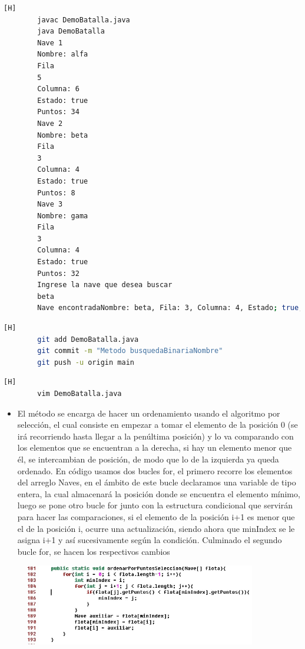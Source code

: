 \documentclass{article}
\begin{document}
	
	\begin{lstlisting}[language=bash,caption={Probando el metodo busquedaBinariaNombre}][H]	
		javac DemoBatalla.java
		java DemoBatalla
		Nave 1
		Nombre: alfa
		Fila
		5
		Columna: 6
		Estado: true
		Puntos: 34
		Nave 2
		Nombre: beta
		Fila
		3
		Columna: 4
		Estado: true
		Puntos: 8
		Nave 3
		Nombre: gama
		Fila
		3
		Columna: 4
		Estado: true
		Puntos: 32
		Ingrese la nave que desea buscar
		beta
		Nave encontradaNombre: beta, Fila: 3, Columna: 4, Estado; true, Puntos: 8
	\end{lstlisting}
	\begin{lstlisting}[language=bash,caption={Commit:"Metodo busquedaBinariaNombre" }][H]
		git add DemoBatalla.java
		git commit -m "Metodo busquedaBinariaNombre"			
		git push -u origin main
	\end{lstlisting}
	
	
	
	
	

	
	\begin{lstlisting}[language=bash,caption={Implementado el método ordenarPorPuntosSeleccion }][H]
		vim DemoBatalla.java
	\end{lstlisting}
	
	
	\begin{itemize}	
		\item El método se encarga de hacer un ordenamiento usando el algoritmo por selección, el cual consiste en empezar a tomar el elemento de la posición 0 (se irá recorriendo hasta llegar a la penúltima posición) y lo va comparando con los elementos que se encuentran a la derecha, si hay un elemento menor que él, se intercambian de posición, de modo que lo de la izquierda ya queda ordenado. En código usamos dos bucles for, el primero recorre los elementos del arreglo Naves, en el ámbito de este bucle declaramos una variable de tipo entera, la cual almacenará la posición donde se encuentra el elemento mínimo, luego se pone otro bucle for  junto con la estructura condicional que servirán para hacer las comparaciones, si el elemento de la posición i+1  es menor que el de la posición i, ocurre una actualización, siendo ahora que minIndex se le asigna i+1 y  así sucesivamente según la condición. Culminado el segundo bucle for, se hacen los respectivos cambios
	\end{itemize}	
	
	\begin{figure}[H]
		\centering
		\includegraphics[width=0.9\textwidth,keepaspectratio]{img/9.jpg}
	\end{figure}
	
\end{document}
